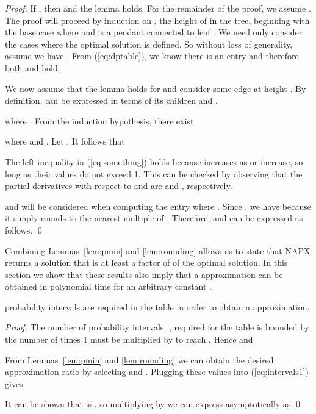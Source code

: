 \documentclass[10pt]{llncs}       \usepackage{graphicx,subfigure}
\begin{document}
\begin{proof}
If , then  and the lemma holds.  For the remainder of the
proof, we assume .  
The proof will proceed by induction on , the height of  in the tree,
beginning with the base case where  and  is a pendant connected to
leaf .  We need only consider the cases where the optimal solution is
defined. So without loss of generality, assume we have . From (\ref{eq:dptable}), we know there is an entry 
 and therefore both  and  hold.

We now assume that the lemma holds for  and consider some edge 
at height . By definition,  can be expressed in terms of its
children  and .

where . From the induction hypothesis, there exist

where  and .  Let .
It follows that

The left inequality in (\ref{eq:something}) 
holds because  increases
as  or  increase, so long as their values do not exceed 1. This
can be
 checked by observing that the partial derivatives with respect to  and
 are  and , respectively.

 and  will be considered when computing the entry
 where . Since , we have
  because it simply rounds  to the nearest multiple of . 
Therefore,  and  can  be expressed as follows.
\qed
\end{proof}

Combining Lemmas~\ref{lem:pmin} and \ref{lem:rounding} allows us to state
that NAPX returns a solution that is at least a factor 
of  of the optimal solution.  In this section we
show that these results also imply that a  approximation can be
obtained in polynomial time for an arbitrary constant .

\begin{lemma}
  \label{lem:tsize}
 
probability intervals are required in the table in order to obtain 
a  approximation.
\end{lemma}
\begin{proof}
The number of probability intervals, , required for the table is bounded by
the number of times 1 must be multiplied by  to reach .  
Hence  and

From  Lemmas~\ref{lem:pmin} and \ref{lem:rounding} we can obtain the desired
approximation ratio by selecting 
and . Plugging these values into 
(\ref{eq:intervals1}) gives

It can be shown that  is ,  so 
multiplying by  we can express  asymptotically as 
\qed
\end{proof}
\end{document}

